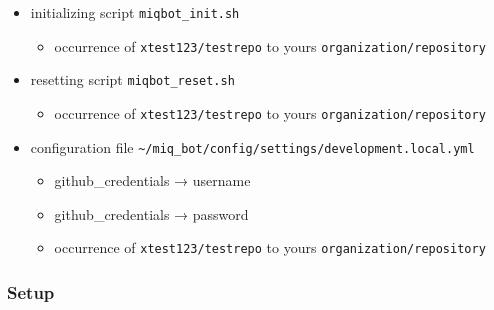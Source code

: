 \begin{itemize}
\tightlist
\item
  initializing script \texttt{miqbot\_init.sh}

  \begin{itemize}
  \tightlist
  \item
    occurrence of \texttt{xtest123/testrepo} to yours
    \texttt{organization/repository}
  \end{itemize}
\item
  resetting script \texttt{miqbot\_reset.sh}

  \begin{itemize}
  \tightlist
  \item
    occurrence of \texttt{xtest123/testrepo} to yours
    \texttt{organization/repository}
  \end{itemize}
\item
  configuration file
  \texttt{\textasciitilde{}/miq\_bot/config/settings/development.local.yml}

  \begin{itemize}
  \tightlist
  \item
    github\_credentials → username
  \item
    github\_credentials → password
  \item
    occurrence of \texttt{xtest123/testrepo} to yours
    \texttt{organization/repository}
  \end{itemize}
\end{itemize}

\subsubsection{Setup}\label{setup}

